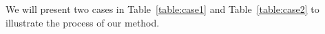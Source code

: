 We will present two cases in Table~\ref{table:case1} and Table~\ref{table:case2} to illustrate the process of our method.
